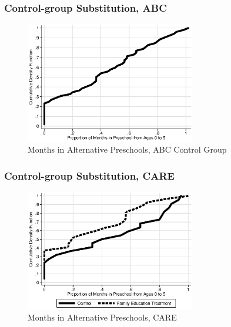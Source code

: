 \documentclass[static]{JJH-Beamer}
\begin{document}

\begin{frame}
\frametitle{Control-group Substitution, ABC}\label{t_abc_substitution}
\begin{figure}
\caption{Months in Alternative Preschools, ABC Control Group}
	\includegraphics[width=20em]{output/abc_controlcontamination_months.eps}
\end{figure}
\hyperlink{abc_subsidized}{}
\end{frame}


\begin{frame}
\frametitle{Control-group Substitution, CARE}\label{t_care_substitution}
\begin{figure}
\caption{Months in Alternative Preschools, CARE}
	\includegraphics[width=20em]{output/care_controlcontamination_months.eps}
\end{figure}
\hyperlink{care_subsidized}{}
\end{frame}

\end{document}
